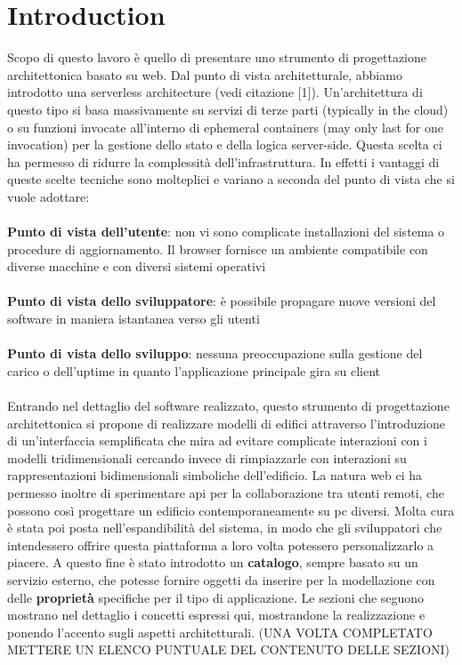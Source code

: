 \section{Introduction}

Scopo di questo lavoro è quello di presentare uno strumento di progettazione architettonica basato su web. Dal punto di vista architetturale, abbiamo introdotto una serverless architecture (vedi citazione [1]). Un’architettura di questo tipo si basa massivamente su servizi di terze parti (typically in the cloud) o su funzioni invocate all’interno di ephemeral containers (may only last for one invocation) per la gestione dello stato e della logica server-side. Questa scelta ci ha permesso di ridurre la complessità dell’infrastruttura.
In effetti i vantaggi di queste scelte tecniche sono molteplici e variano a seconda del punto di vista che si vuole adottare:
\\\\
\textbf{Punto di vista dell'utente}: non vi sono complicate installazioni del sistema o procedure di aggiornamento. Il browser fornisce un ambiente compatibile con diverse macchine e con diversi sistemi operativi\\
\\
\textbf{Punto di vista dello sviluppatore}: è possibile propagare nuove versioni del software in maniera istantanea verso gli utenti\\
\\
\textbf{Punto di vista dello sviluppo}: nessuna preoccupazione sulla gestione del carico o dell’uptime in quanto l’applicazione principale gira su client\\\\
Entrando nel dettaglio del software realizzato, questo strumento di progettazione architettonica si propone di realizzare modelli di edifici attraverso l’introduzione di un’interfaccia semplificata che mira ad evitare complicate interazioni con i modelli tridimensionali cercando invece di rimpiazzarle con interazioni su rappresentazioni bidimensionali simboliche dell’edificio.
La natura web ci ha permesso inoltre di sperimentare api per la collaborazione tra utenti remoti, che possono così progettare un edificio contemporaneamente su pc diversi.
Molta cura è stata poi posta nell’espandibilità del sistema, in modo che gli sviluppatori che intendessero offrire questa piattaforma a loro volta potessero personalizzarlo a piacere. A questo fine è stato introdotto un \textbf{catalogo}, sempre basato su un servizio esterno, che potesse fornire oggetti da inserire per la modellazione con delle \textbf{proprietà} specifiche per il tipo di applicazione.
Le sezioni che seguono mostrano nel dettaglio i concetti espressi qui, mostrandone la realizzazione e ponendo l’accento sugli aspetti architetturali. (UNA VOLTA COMPLETATO METTERE UN ELENCO PUNTUALE DEL CONTENUTO DELLE SEZIONI)
